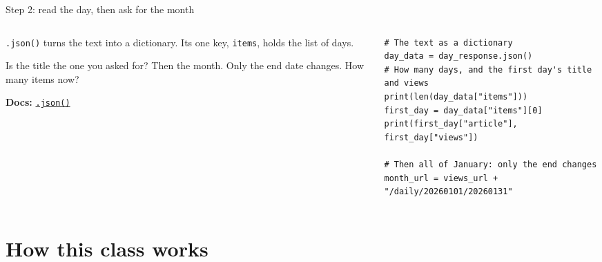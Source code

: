 \documentclass[9pt,aspectratio=169]{beamer}
\begin{document}
\begin{frame}[fragile]{Step 2: read the day, then ask for the month}
    \begin{columns}[T]
        \begin{column}{0.37\textwidth}
            \texttt{.json()} turns the text into a dictionary. Its one key, \texttt{items}, holds the list of days.

            \medskip
            Is the title the one you asked for? Then the month. Only the end date changes. How many items now?

            \medskip
            {\scriptsize\textbf{Docs:} \href{https://requests.readthedocs.io/en/stable/user/quickstart/\#json-response-content}{\texttt{.json()}}\par}
        \end{column}
        \begin{column}{0.6\textwidth}
\begin{lstlisting}
# The text as a dictionary
day_data = day_response.json()
# How many days, and the first day's title and views
print(len(day_data["items"]))
first_day = day_data["items"][0]
print(first_day["article"], first_day["views"])

# Then all of January: only the end changes
month_url = views_url + "/daily/20260101/20260131"
\end{lstlisting}
        \end{column}
    \end{columns}
\end{frame}

\section{How this class works}
\end{document}
